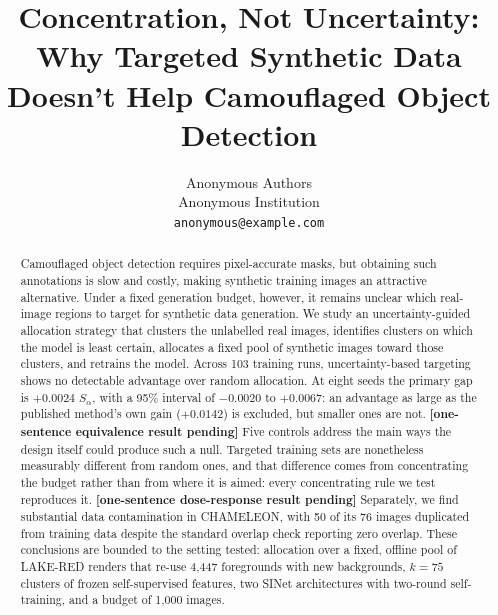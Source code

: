 \documentclass{article}
\title{Concentration, Not Uncertainty: Why Targeted Synthetic Data Doesn't Help Camouflaged Object Detection}
\author{Anonymous Authors \\
Anonymous Institution \\
\texttt{anonymous@example.com}
}
\newcommand{\cdrshort}{\textbf{[one-sentence dose-response result pending]}}
\newcommand{\eqshort}{\textbf{[one-sentence equivalence result pending]}}
\begin{document}
\maketitle

\begin{abstract}
%

Camouflaged object detection requires pixel-accurate masks, but obtaining such annotations is slow and costly, making synthetic training images an attractive alternative. Under a fixed generation budget, however, it remains unclear which real-image regions to target for synthetic data generation. We study an uncertainty-guided allocation strategy that clusters the unlabelled real images, identifies clusters on which the model is least certain, allocates a fixed pool of synthetic images toward those clusters, and retrains the model. Across 103 training runs, uncertainty-based targeting shows no detectable advantage over random allocation. At eight seeds the primary gap is $+0.0024$ $S_\alpha$, with a 95\% interval of $-0.0020$ to $+0.0067$: an advantage as large as the published method's own gain ($+0.0142$) is excluded, but smaller ones are not. \eqshort{} Five controls address the main ways the design itself could produce such a null. Targeted training sets are nonetheless measurably different from random ones, and that difference comes from concentrating the budget rather than from where it is aimed: every concentrating rule we test reproduces it. \cdrshort{} Separately, we find substantial data contamination in CHAMELEON, with 50 of its 76 images duplicated from training data despite the standard overlap check reporting zero overlap. These conclusions are bounded to the setting tested: allocation over a fixed, offline pool of LAKE-RED renders that re-use 4,447 foregrounds with new backgrounds, $k = 75$ clusters of frozen self-supervised features, two SINet architectures with two-round self-training, and a budget of 1,000 images.
\end{abstract}
\end{document}
